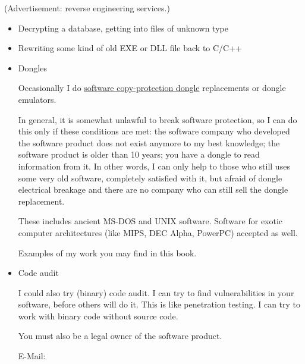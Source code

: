 
(Advertisement: reverse engineering services.)

\begin{itemize}
\item Decrypting a database, getting into files of unknown type

\item Rewriting some kind of old EXE or DLL file back to C/C++

\item Dongles

Occasionally I do \href{https://en.wikipedia.org/wiki/Software_protection_dongle}{software copy-protection dongle} replacements or dongle emulators.

In general, it is somewhat unlawful to break software protection, so I can do this only if these conditions are met:
the software company who developed the software product does not exist anymore to my best knowledge;
the software product is older than 10 years;
you have a dongle to read information from it. In other words, I can only help to those who still uses some very old software, completely satisfied with it, but afraid of dongle electrical breakage and there are no company who can still sell the dongle replacement.

These includes ancient MS-DOS and UNIX software. Software for exotic computer architectures (like MIPS, DEC Alpha, PowerPC) accepted as well.

Examples of my work you may find in this book.

\item Code audit

I could also try (binary) code audit.
I can try to find vulnerabilities in your software, before others will do it.
This is like penetration testing.
I can try to work with binary code without source code.

You must also be a legal owner of the software product.

E-Mail: \EMAIL %
\end{itemize}

\iffalse
\bigskip

Please donate to this project so I can continue to work on the book and other articles. \\
Bitcoin: 1LLa7aqQbRmCYbccnCNwaLgxK9jFPTqPw

\bigskip

Stay tuned:

My
\href{https://twitter.com/yurichev}{Twitter},
\href{https://www.facebook.com/dennis.yurichev.5}{Facebook},
\href{https://ua.linkedin.com/in/dennis-yurichev-5a8368132}{Linkedin}.

My Telegram channel: @yurichev\_news
\fi

